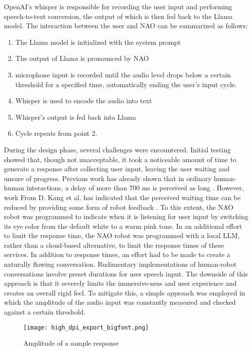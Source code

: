 \documentclass[runningheads]{llncs}
\begin{document}
OpenAI's whisper \cite{whisper} is responsible for recording the user input and performing speech-to-text conversion, the output of which is then fed back to the Llama model. The interaction between the user and NAO can be summarized as follows:
\begin{enumerate}
    \item The Llama model is initialized with the system prompt
    \item The output of Llama is pronounced by NAO
    \item microphone input is recorded until the audio level drops below a certain threshold for a specified time, automatically ending the user's input cycle.
    \item Whisper is used to encode the audio into text
    \item Whisper's output is fed back into Llama
    \item Cycle repeats from point 2.
\end{enumerate}
During the design phase, several challenges were encountered. Initial testing showed that, though not unacceptable, it took a noticeable amount of time to generate a response after collecting user input, leaving the user waiting and unsure of progress. Previous work has already shown that in ordinary human-human interactions, a delay of more than 700 ms is perceived as long \cite{HumanTiming}. However, work From D. Kang et al. has indicated that the perceived waiting time can be reduced by providing some form of robot feedback \cite{RobotDelay}. To this extent, the NAO robot was programmed to indicate when it is listening for user input by switching its eye color from the default white to a warm pink tone. In an additional effort to limit the response time, the NAO robot was programmed with a local LLM, rather than a cloud-based alternative, to limit the response times of these services. In addition to response times, an effort had to be made to create a naturally flowing conversation. Rudimentary implementations of human-robot conversations involve preset durations for user speech input. The downside of this approach is that it severely limits the immersive-ness and user experience and creates an overall rigid feel. To mitigate this, a simple approach was employed in which the amplitude of the audio input was constantly measured and checked against a certain threshold.
\begin{figure}
    \centering
    \texttt{[image: high\_dpi\_export\_bigfont.png]}
    \caption{Amplitude of a sample response}
    \label{fig:audio-threshold}
\end{figure}
\end{document}
